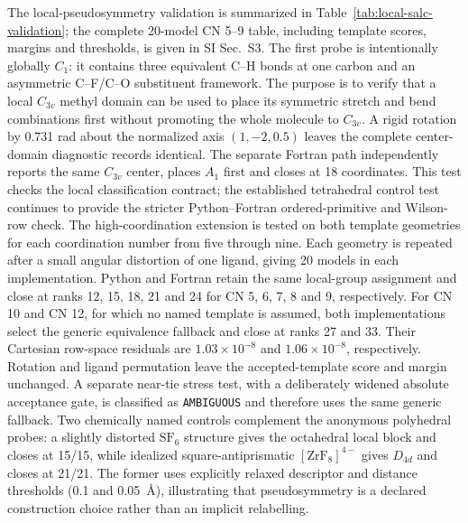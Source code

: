 \documentclass[journal=jctcce,manuscript=article,layout=traditional]{achemso}
\theoremstyle{definition}
\begin{document}
The local-pseudosymmetry validation is summarized in
Table~\ref{tab:local-salc-validation}; the complete 20-model CN 5--9 table,
including template scores, margins and thresholds, is given in SI Sec.~S3.
The first probe is intentionally
globally \(C_1\): it contains three equivalent C--H bonds at one carbon and an
asymmetric C--F/C--O substituent framework.  The purpose is to verify that a
local \(C_{3v}\) methyl domain can be used to place its symmetric stretch and
bend combinations first without promoting the whole molecule to \(C_{3v}\).
A rigid rotation by 0.731 rad about the normalized axis
\((1,-2,0.5)\) leaves the complete center-domain diagnostic records identical.
The separate Fortran path independently reports the same \(C_{3v}\) center,
places \(A_1\) first and closes at 18 coordinates.  This test checks the local
classification contract; the established tetrahedral control test continues
to provide the stricter Python--Fortran ordered-primitive and Wilson-row check.
The high-coordination extension is tested on both template geometries for each
coordination number from five through nine.  Each geometry is repeated after a
small angular distortion of one ligand, giving 20 models in each implementation.
Python and Fortran retain the same local-group assignment and close at ranks
12, 15, 18, 21 and 24 for CN 5, 6, 7, 8 and 9, respectively.
For CN 10 and CN 12, for which no named template is assumed, both
implementations select the generic equivalence fallback and close at ranks 27
and 33.  Their Cartesian row-space residuals are $1.03\times10^{-8}$ and
$1.06\times10^{-8}$, respectively.  Rotation and ligand permutation leave
the accepted-template score and margin unchanged.  A separate near-tie stress
test, with a deliberately widened absolute acceptance gate, is classified as
\texttt{AMBIGUOUS} and therefore uses the same generic fallback.
Two chemically named controls complement the anonymous polyhedral probes: a
slightly distorted \(\mathrm{SF_6}\) structure gives the octahedral local block
and closes at 15/15, while idealized square-antiprismatic
\([\mathrm{ZrF_8}]^{4-}\) gives \(D_{4d}\) and closes at 21/21.  The former uses
explicitly relaxed descriptor and distance thresholds (0.1 and 0.05~\AA),
illustrating that pseudosymmetry is a declared construction choice rather than
an implicit relabelling.
\end{document}
